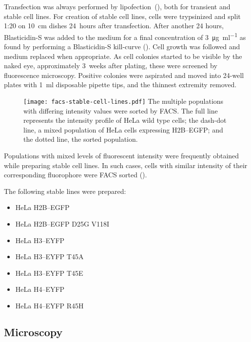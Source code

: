     Transfection was always performed by lipofection~(),
    both for transient and stable cell lines. For creation of stable cell lines,
    cells were trypsinized and split 1:20 on \SI{10}{\cm} dishes 24~hours after transfection.
    After another 24 hours, Blasticidin-S was added to the medium for
    a final concentration of \SI{3}{\ug\per\ml} as found by performing a
    Blasticidin-S kill-curve ().
    Cell growth was followed and medium replaced when appropriate.
    As cell colonies started to be visible by the naked eye, approximately
    3~weeks after plating, these were screened by fluorescence microscopy.
    Positive colonies were aspirated and moved into 24-well plates with
    \SI{1}{\ml} disposable pipette tips, and the thinnest extremity removed.

    \begin{figure}
      \centering
      \texttt{[image: facs-stable-cell-lines.pdf]}
        {
          The multiple populations with differing intensity values were
          sorted by FACS. The full line represents the intensity profile
          of HeLa wild type cells; the dash-dot line, a mixed population
          of HeLa cells expressing H2B--EGFP; and the dotted line, the
          sorted population.
        }
      \label{fig:methods:facs}
    \end{figure}

    Populations with mixed levels of fluorescent intensity were frequently
    obtained while preparing stable cell lines. In such cases, cells with
    similar intensity of their corresponding fluorophore were FACS
    sorted ().

    The following stable lines were prepared:

    \begin{itemize}
      \item HeLa H2B--EGFP
      \item HeLa H2B--EGFP D25G V118I
      \item HeLa H3--EYFP
      \item HeLa H3--EYFP T45A
      \item HeLa H3--EYFP T45E
      \item HeLa H4--EYFP
      \item HeLa H4--EYFP R45H
    \end{itemize}

  \subsection{Microscopy}

